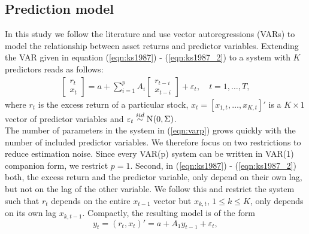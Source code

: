 \subsection{Prediction model}
In this study we follow the literature and use vector autoregressions (VARs) to model the relationship between asset returns and predictor variables. Extending the VAR given in equation (\ref{eqn:ks1987}) - (\ref{eqn:ks1987_2}) to a system with $K$ predictors reads as follows:
\begin{align}\label{eqn:varp}
\begin{bmatrix}r_t\\x_t\end{bmatrix}=a+\sum_{i=1}^pA_i\begin{bmatrix}r_{t-i}\\x_{t-i}\end{bmatrix}+\varepsilon_t,\quad t=1,\ldots,T,	
\end{align}
where $r_t$ is the excess return of a particular stock, $x_t=[x_{1,t},\ldots,x_{K,t}]'$ is a $K\times1$ vector of predictor variables and $\varepsilon_t\stackrel{iid}{\sim}\No{0,\Sigma}$.\\
%
\indent The number of parameters in the system in (\ref{eqn:varp}) grows quickly with the number of included predictor variables. We therefore focus on two restrictions to reduce estimation noise. Since every VAR(p) system can be written in VAR(1) companion form, we restrict $p=1$. %
Second, in (\ref{eqn:ks1987}) - (\ref{eqn:ks1987_2}) both, the excess return and the predictor variable, only depend on their own lag, but not on the lag of the other variable. We follow this and restrict the system such that $r_t$ depends on the entire $x_{t-1}$ vector but $x_{k,t}$, $1\leq k\leq K$, only depends on its own lag $x_{k,t-1}$. Compactly, the resulting model is of the form
\begin{equation}\label{eqn:var1}
y_t=(r_t,x_t)'=a+A_1y_{t-1}+\varepsilon_t,
\end{equation}
